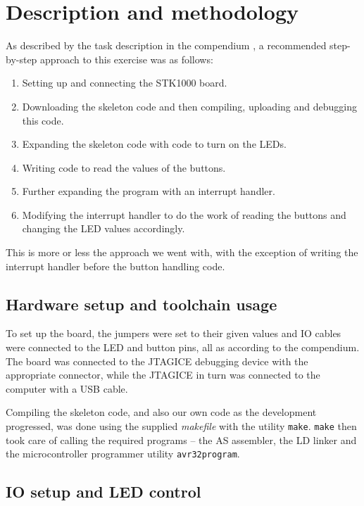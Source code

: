 \section{Description and methodology}

As described by the task description in the compendium \cite{comp}, a
recommended step-by-step approach to this exercise was as follows:

\begin{enumerate}
    \item Setting up and connecting the STK1000 board.
    \item Downloading the skeleton code and then compiling, uploading
    and debugging this code.
    \item Expanding the skeleton code with code to turn on the LEDs.
    \item Writing code to read the values of the buttons.
    \item Further expanding the program with an interrupt handler.
    \item Modifying the interrupt handler to do the work of reading the
    buttons and changing the LED values accordingly.
\end{enumerate}

This is more or less the approach we went with, with the exception of
writing the interrupt handler before the button handling code.

\subsection{Hardware setup and toolchain usage}

To set up the board, the jumpers were set to their given values and IO
cables were connected to the LED and button pins, all as according to
the compendium. The board was connected to the JTAGICE debugging device
with the appropriate connector, while the JTAGICE in turn was connected
to the computer with a USB cable.

Compiling the skeleton code, and also our own code as the development
progressed, was done using the supplied \emph{makefile} with the
utility \texttt{make}. \texttt{make} then took care of calling the
required programs -- the AS assembler, the LD linker and the
microcontroller programmer utility \texttt{avr32program}.

\subsection{IO setup and LED control}

